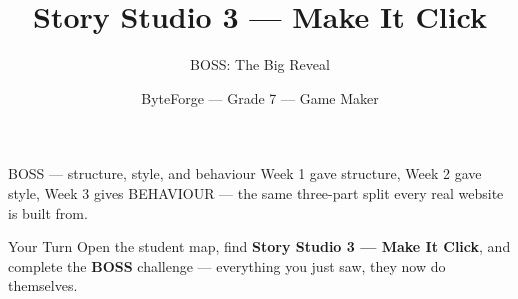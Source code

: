\documentclass[aspectratio=169]{beamer}
\title{Story Studio 3 — Make It Click}
\subtitle{BOSS: The Big Reveal}
\author{ByteForge --- Grade 7 --- Game Maker}
\date{}
\begin{document}
\begin{frame}
    \titlepage
\end{frame}

\begin{frame}{BOSS — structure, style, and behaviour}
    \Large
    Week 1 gave structure, Week 2 gave style, Week 3 gives BEHAVIOUR — the same three-part split every real website is built from.
\end{frame}

\begin{frame}{Your Turn}
    \Large
    Open the student map, find \textbf{Story Studio 3 — Make It Click}, and complete
    the \textbf{BOSS} challenge --- everything you just saw, they now do themselves.
\end{frame}
\end{document}
